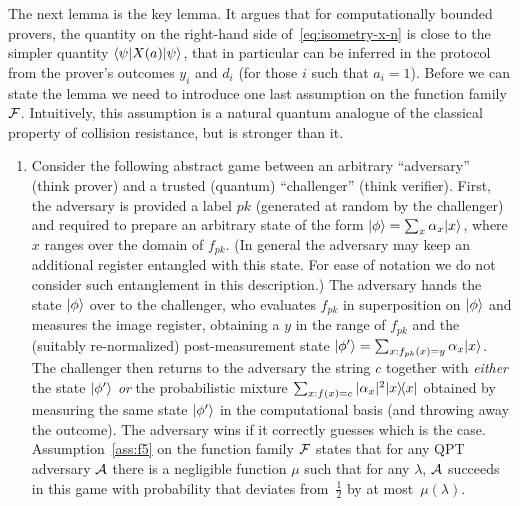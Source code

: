 The next lemma is the key lemma. It argues that for computationally bounded provers, the quantity on the right-hand side of~\eqref{eq:isometry-x-n} is close to the simpler quantity $\langle\psi| X(a) |\psi\rangle$, that in particular can be inferred in the protocol from the prover's outcomes $y_i$ and $d_i$ (for those $i$ such that $a_i=1$). Before we can state the lemma
we need to introduce one last assumption on the function family $\mathcal{F}$. Intuitively, this assumption is a natural quantum analogue of the classical property of collision resistance, but is stronger than it. 
\begin{enumerate}[label=(\textbf{F.5})]
\item\label{ass:f5}
Consider the following abstract game between an arbitrary ``adversary'' (think prover) and a trusted (quantum) ``challenger'' (think verifier). First, the adversary is provided a label $pk$ (generated at random by the challenger) and required to prepare an arbitrary state of the form $|\phi\rangle = \sum_x \alpha_x |x\rangle$, where $x$ ranges over the domain of $f_{pk}$. (In general the adversary may keep an additional register entangled with this state. For ease of notation we do not consider such entanglement in this description.) The adversary hands the state $|\phi\rangle$ over to the challenger, who evaluates $f_{pk}$ in superposition on $|\phi\rangle$ and measures the image register, obtaining a $y$ in the range of $f_{pk}$ and the (suitably re-normalized) post-measurement state $|\phi'\rangle = \sum_{x:f_{pk}(x)=y} \alpha_x |x\rangle$. The challenger then returns to the adversary the string $c$ together with \emph{either} the state $|\phi'\rangle$ \emph{or} the probabilistic mixture $\sum_{x:f(x)=c} |\alpha_x|^2 |x\rangle\!\langle x|$ obtained by measuring the same state $|\phi'\rangle$ in the computational basis (and throwing away the outcome). The adversary wins if it correctly guesses which is the case. Assumption~\ref{ass:f5} on the function family $\mathcal{F}$ states that for any QPT adversary $\mathcal{A}$ there is a negligible function $\mu$ such that for any $\lambda$, $\mathcal{A}$ succeeds in this game with probability that deviates from~$\frac{1}{2}$ by at most~$\mu(\lambda)$.
\end{enumerate}

